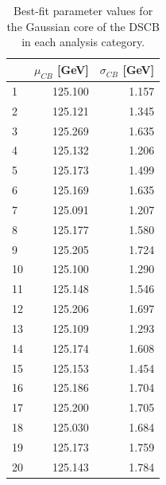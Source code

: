 \begin{table}[!htp]
\begin{center}
\begin{tabular}{lrr}
        \hline
        {} & $\mu_{CB}$ [GeV] & $\sigma_{CB}$ [GeV]  \\
        \hline
        1 & 125.100 & 1.157 \\
        2 & 125.121 & 1.345 \\
        3 & 125.269 & 1.635 \\
        4 & 125.132 & 1.206 \\
        5 & 125.173 & 1.499 \\
        6 & 125.169 & 1.635 \\
        7 & 125.091 & 1.207 \\
        8 & 125.177 & 1.580 \\
        9 & 125.205 & 1.724 \\
        10 & 125.100 & 1.290  \\
        11 & 125.148 & 1.546 \\
        12 & 125.206 & 1.697 \\ \hline

        13 & 125.109 & 1.293 \\
        14 & 125.174 & 1.608 \\
        15 & 125.153 & 1.454 \\
        16 & 125.186 & 1.704 \\
        17 & 125.200 & 1.705 \\
        18 & 125.030 & 1.684 \\
        19 & 125.173 & 1.759 \\
        20 & 125.143 & 1.784 \\
        \hline
\end{tabular}
\caption{Best-fit parameter values for the Gaussian core of the DSCB in each analysis category.}
\label{tab:sig_param1}
\end{center}
\end{table}

